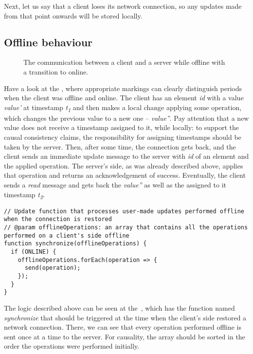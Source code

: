 Next, let us say that a client loses its network connection, so any updates made from that point onwards will be stored locally.  

\subsection*{Offline behaviour}

\begin{figure}[!htb]
    \begin{center}
    \def\svgwidth{\linewidth}
    
    \caption {The communication between a client and a server while offline with a transition to online.}
    \label{fig:design4}
\end{center}
\end{figure}

Have a look at the , where appropriate markings can clearly distinguish periods when the client was offline and online. The client has an element \textit{id} with a value \textit{value'} at timestamp \textit{t\textsubscript{1}} and then makes a local change applying some operation, which changes the previous value to a new one -- \textit{value''}. Pay attention that a new value does not receive a timestamp assigned to it, while locally: to support the causal consistency claims, the responsibility for assigning timestamps should be taken by the server. Then, after some time, the connection gets back, and the client sends an immediate update message to the server with \textit{id} of an element and the applied operation. The server's side, as was already described above, applies that operation and returns an acknowledgement of success. Eventually, the client sends a \textit{read} message and gets back the \textit{value''} as well as the assigned to it timestamp \textit{t\textsubscript{2}}.

\begin{lstlisting}[caption={Pseudocode for sending offline performed operations to the server: client.}, label={lst:offline}]
// Update function that processes user-made updates performed offline when the connection is restored
// @param offlineOperations: an array that contains all the operations performed on a client's side offline
function synchronize(offlineOperations) {
  if (ONLINE) {
    offlineOperations.forEach(operation => {
      send(operation);
    });
  }
}
\end{lstlisting} 

The logic described above can be seen at the~, which has the function named \textit{synchronize} that should be triggered at the time when the client's side restored a network connection. There, we can see that every operation performed offline is sent once at a time to the server. For causality, the array should be sorted in the order the operations were performed initially.

